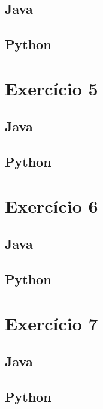 \documentclass[a4paper]{report}
\begin{document}
\section{Java}
\label{java.4}


\section{Python}
\label{python.4}


\chapter{Exercício 5}
\section{Java}
\label{java.5}



\section{Python}
\label{python.5}


\chapter{Exercício 6}
\section{Java}
\label{java.6}


\section{Python}
\label{python.6}


\chapter{Exercício 7}
\section{Java}
\label{java.7}


\section{Python}
\label{python.7}

\end{document}
